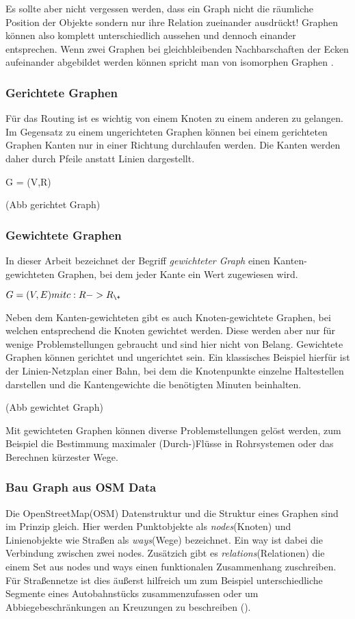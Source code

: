 \documentclass[10pt,a4paper]{article}
\begin{document}
Es sollte aber nicht vergessen werden, dass ein Graph nicht die räumliche Position der Objekte sondern nur ihre Relation zueinander ausdrückt! Graphen können also komplett unterschiedlich aussehen und dennoch einander entsprechen. Wenn zwei Graphen bei gleichbleibenden Nachbarschaften der Ecken aufeinander abgebildet werden können spricht man von isomorphen Graphen \cite[106]{theory}.

\subsubsection{Gerichtete Graphen}
Für das Routing ist es wichtig von einem Knoten zu einem anderen zu gelangen. Im Gegensatz zu einem ungerichteten Graphen können bei einem gerichteten Graphen Kanten nur in einer Richtung durchlaufen werden. Die Kanten werden daher durch Pfeile anstatt Linien dargestellt.

G = (V,R)

(Abb gerichtet Graph)

\subsubsection{Gewichtete Graphen}
In dieser Arbeit bezeichnet der Begriff \textit{gewichteter Graph} einen Kanten-gewichteten Graphen, bei dem jeder Kante ein Wert zugewiesen wird.

$G = (V,E) mit c: R -> R_{\+}$

 Neben dem Kanten-gewichteten gibt es auch Knoten-gewichtete Graphen, bei welchen entsprechend die Knoten gewichtet werden. Diese werden aber nur für wenige Problemstellungen gebraucht und sind hier nicht von Belang. Gewichtete Graphen können gerichtet und ungerichtet sein. Ein klassisches Beispiel hierfür ist der Linien-Netzplan einer Bahn, bei dem die Knotenpunkte einzelne Haltestellen darstellen und die Kantengewichte die benötigten Minuten beinhalten.

(Abb gewichtet Graph)

Mit gewichteten Graphen können diverse Problemstellungen gelöst werden, zum Beispiel die Bestimmung maximaler (Durch-)Flüsse in Rohrsystemen oder das Berechnen kürzester Wege.

\subsubsection{Bau Graph aus OSM Data}

Die OpenStreetMap(OSM) Datenstruktur und die Struktur eines Graphen sind im Prinzip gleich. Hier werden Punktobjekte als \textit{nodes}(Knoten) und Linienobjekte wie Straßen als \textit{ways}(Wege) bezeichnet. Ein way ist dabei die Verbindung zwischen zwei nodes. Zusätzich gibt es \textit{relations}(Relationen) die einem Set aus nodes und ways einen funktionalen Zusammenhang zuschreiben. Für Straßennetze ist dies äußerst hilfreich um zum Beispiel unterschiedliche Segmente eines Autobahnstücks zusammenzufassen oder um Abbiegebeschränkungen an Kreuzungen zu beschreiben (\cite{osmrelation}).
\end{document}
